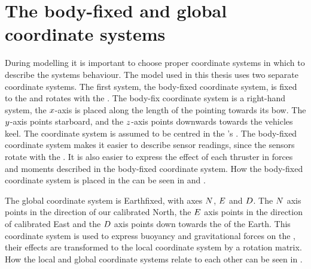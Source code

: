 \section{The body-fixed and global coordinate systems}
\label{sec:coordinates}
During modelling it is important to choose proper coordinate systems in which to describe the systems behaviour.
The \abbrROV model used in this thesis uses two separate coordinate systems.
The first system, the body-fixed coordinate system, is fixed to the \abbrROV and rotates with the \abbrROV. 
The body-fix coordinate system is a right-hand system, the $x$-axis is placed along the length of the \abbrROV pointing towards its bow. The $y$-axis points starboard, and the $z$-axis points downwards towards the vehicles keel. The coordinate system is assumed to be centred in the \abbrROV's \abbrCG. The body-fixed coordinate system makes it easier to describe sensor readings, since the sensors rotate with the \abbrROV. It is also easier to express the effect of each thruster in forces and moments described in the body-fixed coordinate system. How the body-fixed coordinate system is placed in the \abbrROV can be seen in  and .

The global coordinate system is Earthfixed, with axes $N$, $E$ and $D$. The $N$ axis points in the direction of our calibrated North, the $E$ axis points in the direction of calibrated East and the $D$ axis points down towards the \abbrCG of the Earth.
This coordinate system is used to express buoyancy and gravitational forces on the \abbrROV, their effects are transformed to the local coordinate system by a rotation matrix. How the local and global coordinate systems relate to each other can be seen in .

